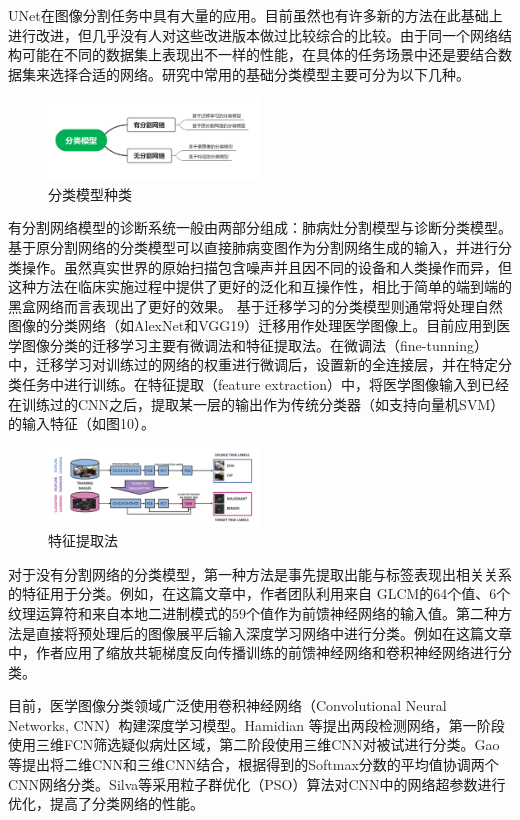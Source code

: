 \documentclass[journal,twoside,web]{ieeecolor}
\begin{document}
UNet在图像分割任务中具有大量的应用。目前虽然也有许多新的方法在此基础上进行改进，但几乎没有人对这些改进版本做过比较综合的比较。由于同一个网络结构可能在不同的数据集上表现出不一样的性能，在具体的任务场景中还是要结合数据集来选择合适的网络。研究中常用的基础分类模型主要可分为以下几种。
\begin{figure}[h]
\centering
\includegraphics[width=0.5\textwidth]{img/fig11.png}
\caption{分类模型种类}
\label{fig:VGG-16}
\end{figure}

有分割网络模型的诊断系统一般由两部分组成：肺病灶分割模型与诊断分类模型。基于原分割网络的分类模型可以直接肺病变图作为分割网络生成的输入，并进行分类操作。虽然真实世界的原始扫描包含噪声并且因不同的设备和人类操作而异，但这种方法在临床实施过程中提供了更好的泛化和互操作性，相比于简单的端到端的黑盒网络而言表现出了更好的效果。 基于迁移学习的分类模型则通常将处理自然图像的分类网络（如AlexNet和VGG19）迁移用作处理医学图像上。目前应用到医学图像分类的迁移学习主要有微调法和特征提取法。在微调法（fine-tunning）中，迁移学习对训练过的网络的权重进行微调后，设置新的全连接层，并在特定分类任务中进行训练。在特征提取（feature extraction）中，将医学图像输入到已经在训练过的CNN之后，提取某一层的输出作为传统分类器（如支持向量机SVM）的输入特征（如图10）。
\begin{figure}[h]
\centering
\includegraphics[width=0.5\textwidth]{img/fig12.png}
\caption{特征提取法}
\label{fig:feature extraction}
\end{figure}

对于没有分割网络的分类模型，第一种方法是事先提取出能与标签表现出相关关系的特征用于分类。例如，在这篇文章中，作者团队利用来自 GLCM的64个值、6个纹理运算符和来自本地二进制模式的59个值作为前馈神经网络的输入值。第二种方法是直接将预处理后的图像展平后输入深度学习网络中进行分类。例如在这篇文章中，作者应用了缩放共轭梯度反向传播训练的前馈神经网络和卷积神经网络进行分类。

目前，医学图像分类领域广泛使用卷积神经网络（Convolutional Neural Networks, CNN）构建深度学习模型。Hamidian 等提出两段检测网络，第一阶段使用三维FCN筛选疑似病灶区域，第二阶段使用三维CNN对被试进行分类。Gao等提出将二维CNN和三维CNN结合，根据得到的Softmax分数的平均值协调两个CNN网络分类。Silva等采用粒子群优化（PSO）算法对CNN中的网络超参数进行优化，提高了分类网络的性能。
\end{document}
